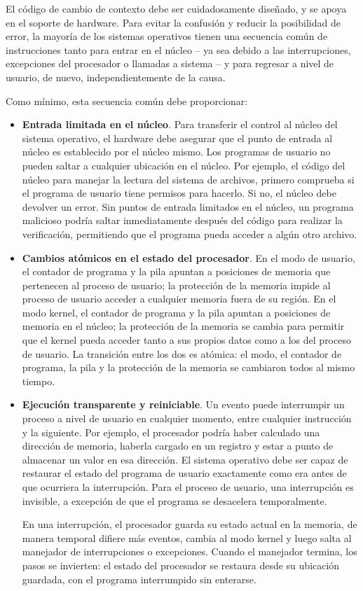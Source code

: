 \documentclass[10pt]{book}
\begin{document}
El código de cambio de contexto debe ser cuidadosamente diseñado, y se apoya en el soporte de hardware. Para evitar la confusión y reducir la posibilidad de error, la mayoría de los sistemas operativos tienen una secuencia común de instrucciones tanto para entrar en el núcleo -- ya sea debido a las interrupciones, excepciones del procesador o llamadas a sistema -- y para regresar a nivel de usuario, de nuevo, independientemente de la causa.

Como mínimo, esta secuencia común debe proporcionar:
\begin{itemize}
\item \textbf{Entrada limitada en el núcleo}. Para transferir el control al núcleo del sistema operativo, el hardware debe asegurar que el punto de entrada al núcleo es establecido por el núcleo mismo. Los programas de usuario no pueden saltar a cualquier ubicación en el núcleo. Por ejemplo, el código del núcleo para manejar la lectura del sistema de archivos, primero comprueba si el programa de usuario tiene permisos para hacerlo. Si no, el núcleo debe devolver un error. Sin puntos de entrada limitados en el núcleo, un programa malicioso podría saltar inmediatamente después del código para realizar la verificación, permitiendo que el programa pueda acceder a algún otro archivo.

\item \textbf{Cambios atómicos en el estado del procesador}. En el modo de usuario, el contador de programa y la pila apuntan a posiciones de memoria que pertenecen al proceso de usuario; la protección de la memoria impide al proceso de usuario acceder a cualquier memoria fuera de su región. En el modo kernel, el contador de programa y la pila apuntan a posiciones de memoria en el núcleo; la protección de la memoria se cambia para permitir que el kernel pueda acceder tanto a sus propios datos como a los del proceso de usuario. La transición entre los dos es atómica: el modo, el contador de programa, la pila y la protección de la memoria se cambiaron todos al mismo tiempo.

\item \textbf{Ejecución transparente y reiniciable}. Un evento puede interrumpir un proceso a nivel de usuario en cualquier momento, entre cualquier instrucción y la siguiente. Por ejemplo, el procesador podría haber calculado una dirección de memoria, haberla cargado en un registro y estar a punto de almacenar un valor en esa dirección. El sistema operativo debe ser capaz de restaurar el estado del programa de usuario exactamente como era antes de que ocurriera la interrupción. Para el proceso de usuario, una interrupción es invisible, a excepción de que el programa se desacelera temporalmente.

En una interrupción, el procesador guarda su estado actual en la memoria, de manera temporal difiere más eventos, cambia al modo kernel y luego salta al manejador de interrupciones o excepciones. Cuando el manejador termina, los pasos se invierten: el estado del procesador se restaura desde su ubicación guardada, con el programa interrumpido sin enterarse.
\end{itemize}
\end{document}
